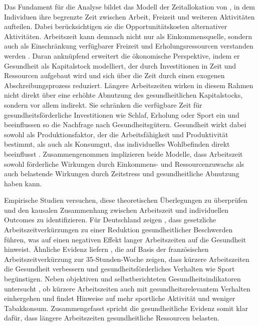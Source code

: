 \documentclass[12pt,a4paper]{article}
\begin{document}
Das Fundament für die Analyse bildet das Modell der Zeitallokation von \textcite{becker1965}, in dem Individuen ihre begrenzte Zeit zwischen Arbeit, Freizeit und weiteren Aktivitäten aufteilen. Dabei berücksichtigen sie die Opportunitätskosten alternativer Aktivitäten. Arbeitszeit kann demnach nicht nur als Einkommensquelle, sondern auch als Einschränkung verfügbarer Freizeit und Erholungsressourcen verstanden werden \parencite{becker1965}. Daran anknüpfend erweitert \textcite{grossman1972} die ökonomische Perspektive, indem er Gesundheit als Kapitalstock modelliert, der durch Investitionen in Zeit und Ressourcen aufgebaut wird und sich über die Zeit durch einen exogenen Abschreibungsprozess reduziert. Längere Arbeitszeiten wirken in diesem Rahmen nicht direkt über eine erhöhte Abnutzung des gesundheitlichen Kapitalstocks, sondern vor allem indirekt. Sie schränken die verfügbare Zeit für gesundheitsförderliche Investitionen wie Schlaf, Erholung oder Sport ein und beeinflussen so die Nachfrage nach Gesundheitsgütern. Gesundheit wirkt dabei sowohl als Produktionsfaktor, der die Arbeitsfähigkeit und Produktivität bestimmt, als auch als Konsumgut, das individuelles Wohlbefinden direkt beeinflusst \parencite{grossman1972}. Zusammengenommen implizieren beide Modelle, dass Arbeitszeit sowohl förderliche Wirkungen durch Einkommens- und Ressourcenzuwachs als auch belastende Wirkungen durch Zeitstress und gesundheitliche Abnutzung haben kann.

Empirische Studien versuchen, diese theoretischen Überlegungen zu überprüfen und den kausalen Zusammenhang zwischen Arbeitszeit und individuellen Outcomes zu identifizieren. Für Deutschland zeigen \textcite{cyganrehm2018}, dass gesetzliche Arbeitszeitverkürzungen zu einer Reduktion gesundheitlicher Beschwerden führen, was auf einen negativen Effekt langer Arbeitszeiten auf die Gesundheit hinweist. Ähnliche Evidenz liefern \textcite{berniell2020}, die auf Basis der französischen Arbeitszeitverkürzung zur 35-Stunden-Woche zeigen, dass kürzere Arbeitszeiten die Gesundheit verbessern und gesundheitsförderliches Verhalten wie Sport begünstigen. Neben objektiven und selbstberichteten Gesundheitsindikatoren untersucht \textcite{ahn2016}, ob kürzere Arbeitszeiten auch mit gesundheitsrelevantem Verhalten einhergehen und findet Hinweise auf mehr sportliche Aktivität und weniger Tabakkonsum. Zusammengefasst spricht die gesundheitliche Evidenz somit klar dafür, dass längere Arbeitszeiten gesundheitliche Ressourcen belasten.  
\end{document}

